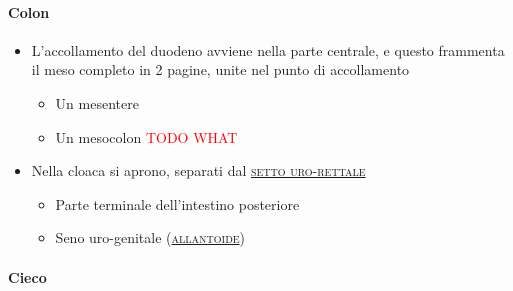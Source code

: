 \documentclass[italian,]{article}
\providecommand{\tightlist}{%
  \setlength{\itemsep}{0pt}\setlength{\parskip}{0pt}}
\renewcommand{\a}[1]{\underline{\textsc{#1}}}
\newcommand{\TODO}[1]{\textcolor{red}{\textsf{\footnotesize{TODO #1}}}} %
\begin{document}
\hypertarget{colon}{%
\paragraph{Colon}\label{colon}}

\begin{itemize}
\tightlist
\item
  L'accollamento del duodeno avviene nella parte centrale, e questo
  frammenta il meso completo in 2 pagine, unite nel punto di
  accollamento

  \begin{itemize}
  \tightlist
  \item
    Un mesentere
  \item
    Un mesocolon \TODO{WHAT}
  \end{itemize}
\item
  Nella cloaca si aprono, separati dal \a{setto uro-rettale}

  \begin{itemize}
  \tightlist
  \item
    Parte terminale dell'intestino posteriore
  \item
    Seno uro-genitale (\a{allantoide})
  \end{itemize}
\end{itemize}

\hypertarget{cieco}{%
\paragraph{Cieco}\label{cieco}}
\end{document}
